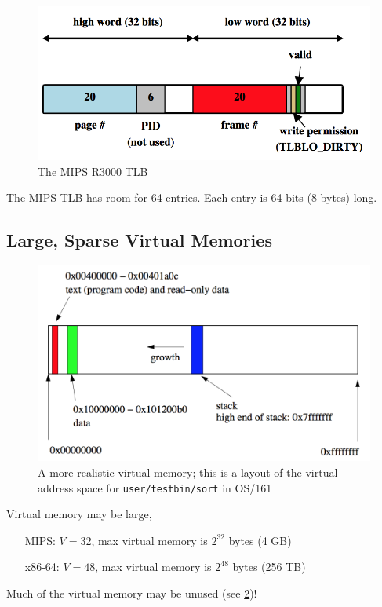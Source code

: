\documentclass[12pt]{article}
\theoremstyle{plain}
\theoremstyle{definition}
\begin{document}
\begin{figure}[H]
  \centering
  \includegraphics[scale=0.6]{pictures/mips_tlb.png}
  \caption{The MIPS R3000 TLB}
  \label{fig:mips_tlb}
\end{figure}
The MIPS TLB has room for 64 entries. Each entry is 64 bits (8 bytes) long.

\subsection{Large, Sparse Virtual Memories}
\begin{figure}[H]
  \centering
  \includegraphics[scale=0.65]{pictures/real_v_mem.png}
  \caption{A more realistic virtual memory; this is a layout of the virtual address space for \texttt{user/testbin/sort} in OS/161}
  \label{fig:realistic_v_mem}
\end{figure}
Virtual memory may be large,
\begin{itemize}
  \item[MIPS:] $V = 32$, max virtual memory is $2^{32}$ bytes (4 GB)
  \item[x86-64:] $V = 48$, max virtual memory is $2^{48}$ bytes (256 TB)
\end{itemize}
Much of the virtual memory may be unused (see \ref{fig:realistic_v_mem})! \\
\end{document}
